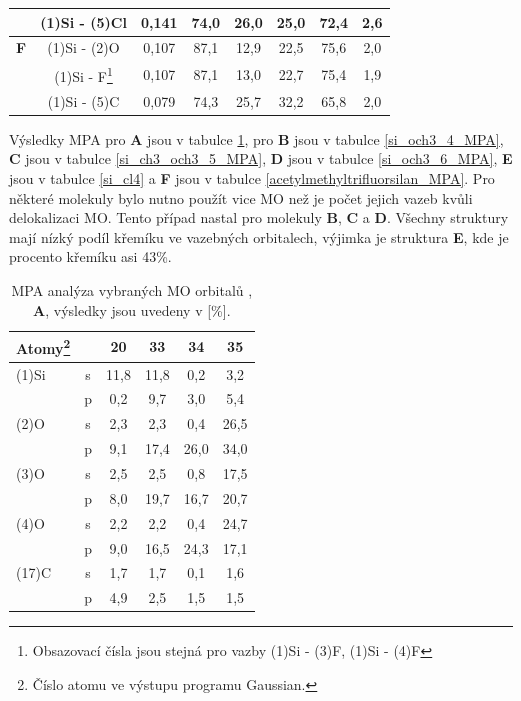 \documentclass[
digital, %
table,   %
lof,     %
lot,     %
oneside,
]{fithesis3}
\begin{document}
\begin{table}[htbp]
\begin{minipage}{\textwidth}
\begin{center}
\begin{tabular}{|l|c|c|c|c|c|c|c|}
&  (1)Si - (5)Cl & 0,141 & 74,0  & 26,0  & 25,0  & 72,4  & 2,6  \\ \hline
\textbf{F}  & (1)Si - (2)O &0,107 & 87,1  & 12,9  & 22,5  & 75,6  & 2,0  \\ \hline
& (1)Si - F\footnote{ Obsazovací čísla jsou stejná pro vazby (1)Si - (3)F, (1)Si - (4)F} & 0,107 & 87,1  & 13,0  & 22,7  & 75,4  & 1,9  \\ \hline
& (1)Si - (5)C &0,079 & 74,3  & 25,7  & 32,2  & 65,8  & 2,0  \\ \hline
\end{tabular}
\end{center}
\end{minipage}
\end{table}

Výsledky MPA pro \textbf{A} jsou v tabulce \ref{si_ch3_och3_MPA}, pro \textbf{B} jsou v tabulce \ref{si_och3_4_MPA}, \textbf{C} jsou v tabulce \ref{si_ch3_och3_5_MPA}, \textbf{D} jsou v tabulce \ref{si_och3_6_MPA}, \textbf{E} jsou v tabulce \ref{si_cl4} a \textbf{F} jsou v tabulce \ref{acetylmethyltrifluorsilan_MPA}. Pro některé molekuly bylo nutno použít vice MO než je počet jejich vazeb kvůli delokalizaci MO. Tento případ nastal pro molekuly \textbf{B}, \textbf{C} a \textbf{D}. Všechny struktury mají nízký podíl křemíku ve vazebných orbitalech, výjimka je struktura \textbf{E}, kde je procento křemíku asi 43\%.

\begin{table}[htbp]\begin{minipage}{\textwidth}
\caption{MPA analýza vybraných MO orbitalů , \textbf{A}, výsledky jsou uvedeny v [\%].}
\begin{center}
\begin{tabular}{|l|c|c|c|c|c|}
\hline
Atomy\footnote{Číslo atomu ve výstupu programu Gaussian.} \label{si_ch3_och3_MPA}&  & 20 & 33 & 34 & 35 \\ \hline
(1)Si & s & 11,8 & 11,8 & 0,2 & 3,2 \\ \hline
& p & 0,2 & 9,7 & 3,0 & 5,4 \\ \hline
(2)O & s & 2,3 & 2,3 & 0,4 & 26,5 \\ \hline
& p & 9,1 & 17,4 & 26,0 & 34,0 \\ \hline
(3)O & s & 2,5 & 2,5 & 0,8 & 17,5 \\ \hline
& p & 8,0 & 19,7 & 16,7 & 20,7 \\ \hline
(4)O & s & 2,2 & 2,2 & 0,4 & 24,7 \\ \hline
& p & 9,0 & 16,5 & 24,3 & 17,1 \\ \hline
(17)C & s & 1,7 & 1,7 & 0,1 & 1,6 \\ \hline
& p & 4,9 & 2,5 & 1,5 & 1,5 \\ \hline
\end{tabular}
\end{center}
\end{minipage}
\end{table}
\end{document}
